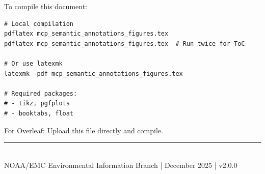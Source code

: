 \documentclass[11pt]{article}
\begin{document}
To compile this document:

\begin{verbatim}
# Local compilation
pdflatex mcp_semantic_annotations_figures.tex
pdflatex mcp_semantic_annotations_figures.tex  # Run twice for ToC

# Or use latexmk
latexmk -pdf mcp_semantic_annotations_figures.tex

# Required packages:
# - tikz, pgfplots
# - booktabs, float
\end{verbatim}

For Overleaf: Upload this file directly and compile.

\vfill
\noindent\rule{\textwidth}{0.5pt}\\
\small{NOAA/EMC Environmental Information Branch | December 2025 | v2.0.0}
\end{document}
